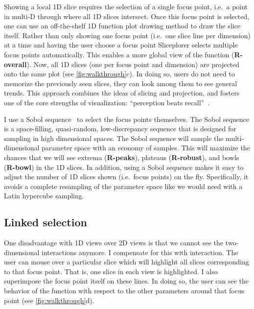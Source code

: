 Showing a local 1D slice requires the selection of a single focus point, i.e.\
a point in multi-D through where all 1D slices intersect. Once this focus
point is selected, one can use an off-the-shelf 1D function plot drawing
method to draw the slice itself.
Rather than only
showing one focus point (i.e.\ one slice line per dimension) at a time and
having the user choose a focus point Sliceplorer selects multiple focus points
automatically. This enables a more global view of the function
(\textbf{R-overall}). Now, all 1D slices (one per focus point and dimension)
are projected onto the same plot (see \autoref{fig:walkthrough}c).  In doing
so, users do not need to memorize the previously seen slices, they can look
among them to see general trends. This approach combines the ideas of slicing
and projection, and fosters one of the core strengths of visualization:
``perception beats recall''~\cite{Munzner:2014}. 

I use a Sobol sequence~\cite{Sobol:1967} to select the focus points
themselves.  The Sobol sequence is a space-filling, quasi-random,
low-discrepancy sequence that is designed for sampling in high dimensional
spaces.  The Sobol sequence will sample the multi-dimensional
parameter space with an economy of samples. This will maximize the chances that
we will see extrema (\textbf{R-peaks}), plateaus (\textbf{R-robust}), and bowls
(\textbf{R-bowl}) in the 1D slices.  In addition, using a Sobol sequence makes
it easy to adjust the number of 1D slices shown (i.e.\ focus points) on the
fly.  Specifically, it avoids a complete resampling of the parameter space like
we would need with a Latin hypercube sampling. 



\subsection{Linked selection}

One disadvantage with 1D views over 2D views is that we cannot see the
two-dimensional interactions anymore. I compensate for this with
interaction. %
The user can mouse over a particular slice which will highlight
all slices corresponding to that focus point. That is, one slice in each view is highlighted.
I also superimpose the focus point itself on these lines. In doing so,
the user can see the behavior of the function with respect to the other
parameters around that focus point (see \autoref{fig:walkthrough}d).

